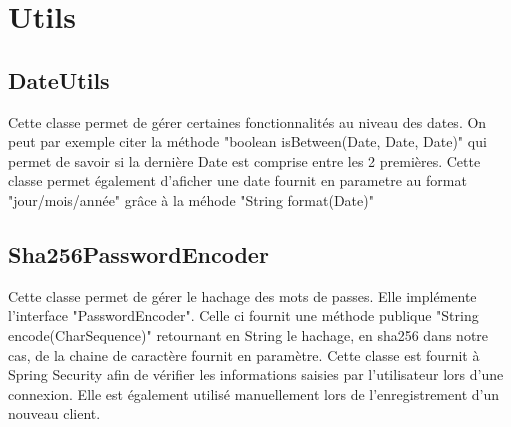 	\section{Utils}

		\subsection{DateUtils}

			Cette classe permet de gérer certaines fonctionnalités au niveau des dates. On peut par exemple citer la méthode "boolean isBetween(Date, Date, Date)" qui permet de savoir si la dernière Date est comprise entre les 2 premières. Cette classe permet également d'aficher une date fournit en parametre au format "jour/mois/année" grâce à la méhode "String format(Date)"

		\subsection{Sha256PasswordEncoder}
			\label{subsec:Sha256PasswordEncoder}

			Cette classe permet de gérer le hachage des mots de passes. Elle implémente l'interface "PasswordEncoder". Celle ci fournit une méthode publique "String encode(CharSequence)" retournant en String le hachage, en sha256 dans notre cas, de la chaine de caractère fournit en paramètre. Cette classe est fournit à Spring Security afin de vérifier les informations saisies par l'utilisateur lors d'une connexion. Elle est également utilisé manuellement lors de l'enregistrement d'un nouveau client.
